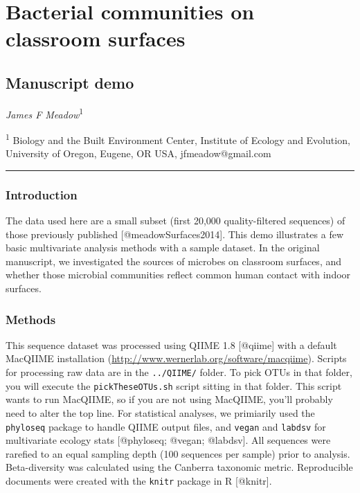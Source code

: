\section{Bacterial communities on classroom surfaces}

\subsection{Manuscript demo}

\emph{James F Meadow}\textsuperscript{1}

\textsuperscript{1} Biology and the Built Environment Center, Institute
of Ecology and Evolution, University of Oregon, Eugene, OR USA,
jfmeadow@gmail.com

\begin{center}\rule{3in}{0.4pt}\end{center}

\subsubsection{Introduction}

The data used here are a small subset (first 20,000 quality-filtered
sequences) of those previously published {[}@meadowSurfaces2014{]}. This
demo illustrates a few basic multivariate analysis methods with a sample
dataset. In the original manuscript, we investigated the sources of
microbes on classroom surfaces, and whether those microbial communities
reflect common human contact with indoor surfaces.

\subsubsection{Methods}

This sequence dataset was processed using QIIME 1.8 {[}@qiime{]} with a
default MacQIIME installation
(\url{http://www.wernerlab.org/software/macqiime}). Scripts for
processing raw data are in the \texttt{../QIIME/} folder. To pick OTUs
in that folder, you will execute the \texttt{pickTheseOTUs.sh} script
sitting in that folder. This script wants to run MacQIIME, so if you are
not using MacQIIME, you'll probably need to alter the top line. For
statistical analyses, we primiarily used the \texttt{phyloseq} package
to handle QIIME output files, and \texttt{vegan} and \texttt{labdsv} for
multivariate ecology stats {[}@phyloseq; @vegan; @labdsv{]}. All
sequences were rarefied to an equal sampling depth (100 sequences per
sample) prior to analysis. Beta-diversity was calculated using the
Canberra taxonomic metric. Reproducible documents were created with the
\texttt{knitr} package in R {[}@knitr{]}.

